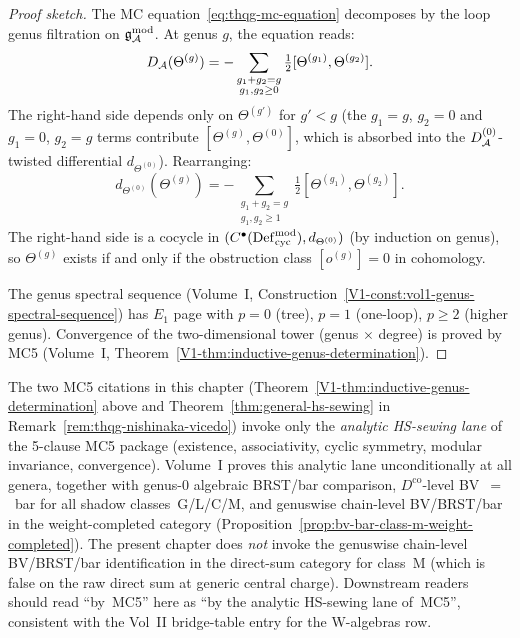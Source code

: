 \begin{proof}[Proof sketch]
The MC equation~\eqref{eq:thqg-mc-equation} decomposes by the loop
genus filtration on $\mathfrak{g}_{\mathcal{A}}^{\mathrm{mod}}$. At genus $g$, the equation reads:
\[
D_{\mathcal{A}}(\Theta^{(g)})
= -\sum_{\substack{g_1+g_2=g \\ g_1,g_2 \ge 0}}
\tfrac{1}{2}[\Theta^{(g_1)}, \Theta^{(g_2)}].
\]
The right-hand side depends only on $\Theta^{(g')}$ for $g' < g$ (the
$g_1=g$, $g_2=0$ and $g_1=0$, $g_2=g$ terms contribute
$[\Theta^{(g)}, \Theta^{(0)}]$, which is absorbed into the
$D_{\mathcal{A}}^{(0)}$-twisted differential $d_{\Theta^{(0)}}$).
Rearranging:
\[
d_{\Theta^{(0)}}(\Theta^{(g)})
= -\sum_{\substack{g_1+g_2=g \\ g_1,g_2 \ge 1}}
\tfrac{1}{2}[\Theta^{(g_1)}, \Theta^{(g_2)}].
\]
The right-hand side is a cocycle in $(C^\bullet(\mathrm{Def}_{\mathrm{cyc}}^{\mathrm{mod}}),
d_{\Theta^{(0)}})$ (by induction on genus), so $\Theta^{(g)}$ exists
if and only if the obstruction class $[o^{(g)}] = 0$ in cohomology.

The genus spectral sequence
(Volume~I, Construction~\ref{V1-const:vol1-genus-spectral-sequence}) has
$E_1$ page with $p=0$ (tree), $p=1$ (one-loop), $p \ge 2$ (higher genus).
Convergence of the two-dimensional tower (genus $\times$ degree) is proved
by MC5 (Volume~I, Theorem~\ref{V1-thm:inductive-genus-determination}).
\end{proof}

\begin{remark}
\label{rem:mc5-citation-scope-guard}
The two MC5 citations in this chapter
(Theorem~\ref*{V1-thm:inductive-genus-determination} above and
Theorem~\ref{thm:general-hs-sewing} in
Remark~\ref*{rem:thqg-nishinaka-vicedo}) invoke only the
\emph{analytic HS-sewing lane} of the 5-clause MC5 package
(existence, associativity, cyclic symmetry, modular invariance,
convergence). Volume~I proves this analytic lane unconditionally at
all genera, together with genus-$0$ algebraic BRST/bar comparison,
$D^{\mathrm{co}}$-level BV~$=$~bar for all shadow classes~G/L/C/M,
and genuswise chain-level BV/BRST/bar in the weight-completed
category (Proposition~\ref{prop:bv-bar-class-m-weight-completed}). The
present chapter does \emph{not} invoke the genuswise chain-level
BV/BRST/bar identification in the direct-sum category for class~M
(which is false on the raw direct sum at generic central charge).
Downstream readers should read
``by~MC5'' here as ``by the analytic HS-sewing lane of~MC5'',
consistent with the Vol~II bridge-table entry for the W-algebras row.
\end{remark}


